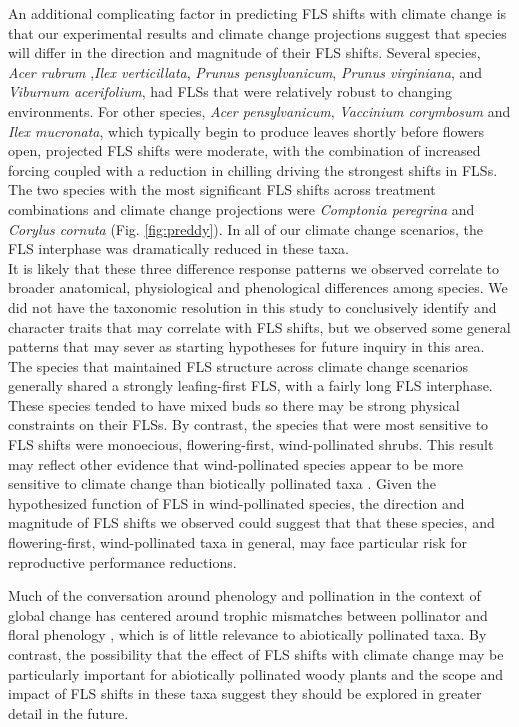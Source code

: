 \documentclass[11pt]{article}
\begin{document}
\noindent An additional complicating factor in predicting FLS shifts with climate change is that our experimental results and climate change projections suggest that species will differ in the direction and magnitude of their FLS shifts. Several species, \textit{Acer rubrum} ,\textit{Ilex verticillata}, \textit{Prunus pensylvanicum}, \textit{Prunus virginiana}, and \textit{Viburnum acerifolium}, had FLSs that were relatively robust to changing environments. For other species, \textit{Acer pensylvanicum}, \textit{Vaccinium corymbosum} and \textit{Ilex mucronata}, which typically begin to produce leaves shortly before flowers open, projected FLS shifts were moderate, with the combination of increased forcing coupled with a reduction in chilling driving the strongest shifts in FLSs. The two species with the most significant FLS shifts across treatment combinations and climate change projections were \textit{Comptonia peregrina} and \textit{Corylus cornuta} (Fig. \ref{fig:preddy}). In all of our climate change scenarios, the FLS interphase was dramatically reduced in these taxa.\\ 

\noindent It is likely that these three difference response patterns we observed correlate to broader anatomical, physiological and phenological differences among species. We did not have the taxonomic resolution in this study to conclusively identify and character traits that may correlate with FLS shifts, but we observed some general patterns that may sever as starting hypotheses for future inquiry in this area.\\

\noindent The species that maintained FLS structure across climate change scenarios generally shared a strongly leafing-first FLS, with a fairly long FLS interphase. These species tended to have mixed buds so there may be strong physical constraints on their FLSs. By contrast, the species that were most sensitive to FLS shifts were monoecious, flowering-first, wind-pollinated shrubs. This result may reflect other evidence that wind-pollinated species appear to be more sensitive to climate change than biotically pollinated taxa \citep{Ziello:2012aa}. Given the hypothesized function of FLS in wind-pollinated species, the direction and magnitude of FLS shifts we observed could suggest that that these species, and flowering-first, wind-pollinated taxa in general, may face particular risk for reproductive performance reductions. 

\noindent Much of the conversation around phenology and pollination in the context of global change has centered around trophic mismatches between pollinator and floral phenology \citep{Memmott2007}, which is of little relevance to abiotically pollinated taxa. By contrast, the possibility that the effect of FLS shifts with climate change may be particularly important for abiotically pollinated woody plants and the scope and impact of FLS shifts in these taxa suggest they should be explored in greater detail in the future.\\
\end{document}
